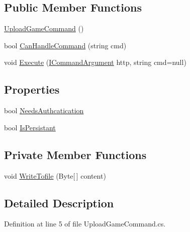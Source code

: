 \subsection*{Public Member Functions}
\begin{DoxyCompactItemize}
\item 
\hyperlink{class_damp_server_1_1_upload_game_command_aff8c290c685d28bfc2e367e498f5ade0}{Upload\-Game\-Command} ()
\item 
bool \hyperlink{class_damp_server_1_1_upload_game_command_a4b279126d4ae69a0eaa185e614e77209}{Can\-Handle\-Command} (string cmd)
\item 
void \hyperlink{class_damp_server_1_1_upload_game_command_ad8731ab5e608034cd00ece1c7224710e}{Execute} (\hyperlink{interface_damp_server_1_1_i_command_argument}{I\-Command\-Argument} http, string cmd=null)
\end{DoxyCompactItemize}
\subsection*{Properties}
\begin{DoxyCompactItemize}
\item 
bool \hyperlink{class_damp_server_1_1_upload_game_command_a0ec840140ed2fc3f004a060c1d638cd2}{Needs\-Authcatication}
\item 
bool \hyperlink{class_damp_server_1_1_upload_game_command_a9c7c283e69f811582a671bad24d3f532}{Is\-Persistant}
\end{DoxyCompactItemize}
\subsection*{Private Member Functions}
\begin{DoxyCompactItemize}
\item 
void \hyperlink{class_damp_server_1_1_upload_game_command_a4333b0920d75516135df13aa9b3dc17d}{Write\-Tofile} (Byte\mbox{[}$\,$\mbox{]} content)
\end{DoxyCompactItemize}


\subsection{Detailed Description}


Definition at line 5 of file Upload\-Game\-Command.\-cs.



